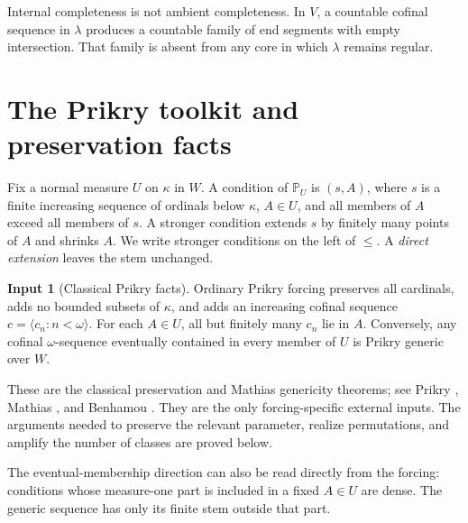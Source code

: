 \documentclass[11pt,letterpaper]{article}
\theoremstyle{definition}
\newtheorem{inputthm}{Input}
\numberwithin{equation}{section}
\newcommand{\PP}{\mathbb P}
\begin{document}
Internal completeness is not ambient completeness. In $V$, a countable cofinal sequence in $\lambda$ produces a countable family of end segments with empty intersection. That family is absent from any core in which $\lambda$ remains regular.

\section{The Prikry toolkit and preservation facts}\label{sec:forcing}

Fix a normal measure $U$ on $\kappa$ in $W$. A condition of $\PP_U$ is $(s,A)$, where $s$ is a finite increasing sequence of ordinals below $\kappa$, $A\in U$, and all members of $A$ exceed all members of $s$. A stronger condition extends $s$ by finitely many points of $A$ and shrinks $A$. We write stronger conditions on the left of $\le$. A \emph{direct extension} leaves the stem unchanged.

\begin{inputthm}[Classical Prikry facts]\label{input:prikry}
Ordinary Prikry forcing preserves all cardinals, adds no bounded subsets of $\kappa$, and adds an increasing cofinal sequence $c=\langle c_n:n<\omega\rangle$. For each $A\in U$, all but finitely many $c_n$ lie in $A$. Conversely, any cofinal $\omega$-sequence eventually contained in every member of $U$ is Prikry generic over $W$.
\end{inputthm}

These are the classical preservation and Mathias genericity theorems; see Prikry \cite{prikry}, Mathias \cite{mathias}, and Benhamou \cite[Corollaries~3.12, 3.15 and Theorem~3.17]{benhamou}. They are the only forcing-specific external inputs. The arguments needed to preserve the relevant parameter, realize permutations, and amplify the number of classes are proved below.

The eventual-membership direction can also be read directly from the forcing: conditions whose measure-one part is included in a fixed $A\in U$ are dense. The generic sequence has only its finite stem outside that part.
\end{document}
